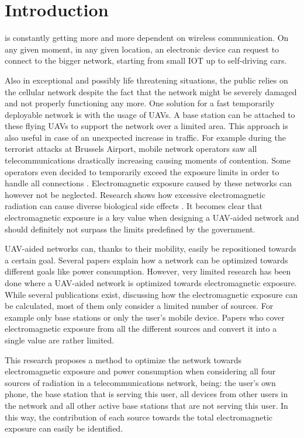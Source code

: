 \documentclass[twocolumn]{phdsymp} %
\begin{document}
\section{Introduction}
 is constantly getting more and more dependent on wireless communication. 
On any given moment, in any given location, an electronic device
can request to connect to the bigger network, 
starting from small \gls{IOT} up to self-driving cars.

Also in exceptional and possibly life threatening situations, the public relies on the cellular network
despite the fact that the network might be severely damaged and not properly functioning any more.
One solution for a fast temporarily deployable network is with the usage of \gls{UAV}s. A base station can be attached to 
these flying \gls{UAV}s to support the network over a limited area. 
This approach is also useful in case of an unexpected increase in traffic. 
For example during the terrorist attacks at Brussels Airport,
mobile network operators saw all telecommunications drastically increasing causing moments of contention. 
Some operators even decided to temporarily exceed the exposure limits in
order to handle all connections \cite{baseZaventem}.
Electromagnetic exposure caused by these networks can however not be neglected. 
Research shows how excessive electromagnetic radiation can cause diverse biological side effects \cite{bioeffects,WHO}.
It becomes clear that electromagnetic exposure is a key value when designing a \gls{UAV}-aided network and should definitely 
not surpass the limits predefined by the government.

\gls{UAV}-aided networks can, thanks to their mobility, easily be repositioned towards a certain goal. Several papers 
explain how a network can be optimized towards different goals like power consumption.
However, very limited
research has been done where a \gls{UAV}-aided network is optimized towards electromagnetic exposure.
While several publications exist, discussing how the electromagnetic exposure can be calculated, 
most of them only consider a limited number of sources. For example only base stations or only the user's mobile device.
Papers who cover electromagnetic exposure from all the different sources and convert it into a single value are rather limited.

This research proposes a method to optimize the network towards electromagnetic exposure and power consumption
when considering all four sources of radiation in a telecommunications network, being: the user's own phone,
 the base station that is serving this user, 
all devices from other users in the network and all 
other active base stations that are not serving this user. In this way, the contribution of each source towards the total 
electromagnetic exposure can easily be identified. 
\end{document}
